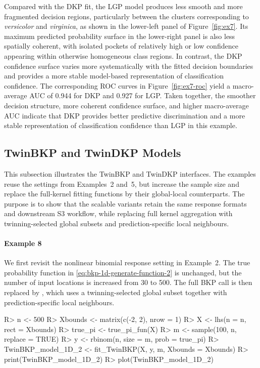 \documentclass[article, shortnames]{jss}
\newcommand{\fct}[1]{\code{#1()}}
\begin{document}
Compared with the DKP fit, the LGP model produces less smooth and more fragmented decision regions, particularly between the clusters corresponding to \emph{versicolor} and \emph{virginica}, as shown in the lower-left panel of Figure~\ref{fig:ex7}. 
Its maximum predicted probability surface in the lower-right panel is also less spatially coherent, with isolated pockets of relatively high or low confidence appearing within otherwise homogeneous class regions. 
In contrast, the DKP confidence surface varies more systematically with the fitted decision boundaries and provides a more stable model-based representation of classification confidence. 
The corresponding ROC curves in Figure~\ref{fig:ex7-roc} yield a macro-average AUC of 0.944 for DKP and 0.927 for LGP. 
Taken together, the smoother decision structure, more coherent confidence surface, and higher macro-average AUC indicate that DKP provides better predictive discrimination and a more stable representation of classification confidence than LGP in this example. 

\subsection{TwinBKP and TwinDKP Models}\label{sec:example_twin}

This subsection illustrates the TwinBKP and TwinDKP interfaces. 
The examples reuse the settings from Examples~2 and~5, but increase the sample size and replace the full-kernel fitting functions by their global-local counterparts. 
The purpose is to show that the scalable variants retain the same response formats and downstream S3 workflow, while replacing full kernel aggregation with twinning-selected global subsets and prediction-specific local neighbours.

\paragraph{Example 8} 
We first revisit the nonlinear binomial response setting in Example~2. 
The true probability function in \eqref{eq:bkp-1d-generate-function-2} is unchanged, but the number of input locations is increased from 30 to 500. 
The full BKP call is then replaced by \fct{fit\_TwinBKP}, which uses a twinning-selected global subset together with prediction-specific local neighbours.

\begin{CodeChunk}
\begin{CodeInput} 
R> n <- 500
R> Xbounds <- matrix(c(-2, 2), nrow = 1)
R> X <- lhs(n = n, rect = Xbounds)
R> true_pi <- true_pi_fun(X)
R> m <- sample(100, n, replace = TRUE)
R> y <- rbinom(n, size = m, prob = true_pi)
R> TwinBKP_model_1D_2 <- fit_TwinBKP(X, y, m, Xbounds = Xbounds)
R> print(TwinBKP_model_1D_2)
R> plot(TwinBKP_model_1D_2)
\end{CodeInput}
\end{CodeChunk}
\end{document}
